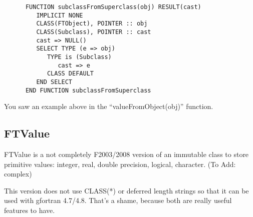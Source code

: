 \documentclass[9pt]{article}
\begin{document}
{\color{blue}\begin{verbatim}
      FUNCTION subclassFromSuperclass(obj) RESULT(cast)
         IMPLICIT NONE  
         CLASS(FTObject), POINTER :: obj
         CLASS(Subclass), POINTER :: cast
         cast => NULL()
         SELECT TYPE (e => obj)
            TYPE is (Subclass)
               cast => e
            CLASS DEFAULT
         END SELECT
      END FUNCTION subclassFromSuperclass
\end{verbatim}}

You saw an example above in the ``valueFromObject(obj)'' function.
\subsection{FTValue}
 FTValue is a not completely F2003/2008 version of an immutable class
 to store primitive values: integer, real, double precision, logical,
 character. (To Add: complex)

 This version does not use CLASS(*) or deferred length strings
 so that it can be used with gfortran 4.7/4.8. That's a shame, because both are really useful features to have.
\end{document}
